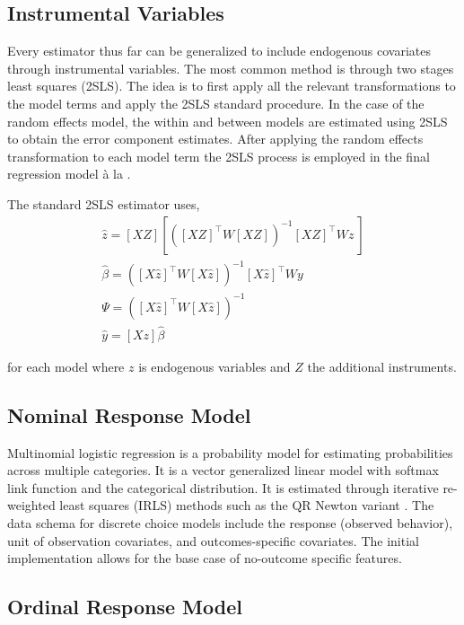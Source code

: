 \documentclass{juliacon}
\begin{document}
\subsection{Instrumental Variables}

Every estimator thus far can be generalized to include endogenous covariates through instrumental variables. The most common method is through two stages least squares (2SLS). The idea is to first apply all the relevant transformations to the model terms and apply the 2SLS standard procedure. In the case of the random effects model, the within and between models are estimated using 2SLS to obtain the error component estimates. After applying the random effects transformation to each model term the 2SLS process is employed in the final regression model à la \cite{BV_1987}.

The standard 2SLS estimator uses,
\begin{equation}
\begin{split}
\hat{z} = [X Z] \left[ \left( [X Z]^{\top} W [X Z] \right)^{-1} [X Z]^{\top} W z\ \right] \\
\hat{\beta} = \left( [X \hat{z}]^{\top} W [X \hat{z}] \right)^{-1} [X \hat{z}]^{\top} W y \\
\Psi = \left( [X \hat{z}]^{\top} W [X \hat{z}] \right)^{-1} \\
\hat{y} = [X z] \hat{\beta}
\end{split}
\end{equation}

for each model where $z$ is endogenous variables and $Z$ the additional instruments.

\subsection{Nominal Response Model}

Multinomial logistic regression is a probability model for estimating probabilities across multiple categories. It is a vector generalized linear model with softmax link function and the categorical distribution. It is estimated through iterative re-weighted least squares (IRLS) methods such as the QR Newton variant \cite{OLeary_1990}. The data schema for discrete choice models include the response (observed behavior), unit of observation covariates, and outcomes-specific covariates. The initial implementation allows for the base case of no-outcome specific features.

\subsection{Ordinal Response Model}
\end{document}
